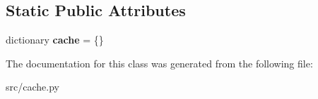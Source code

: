 \subsection*{\-Static \-Public \-Attributes}
\begin{DoxyCompactItemize}
\item 
\hypertarget{classsrc_1_1cache_1_1_chunk_cache_ad737632ad120595e27c9363c88e5767b}{dictionary {\bfseries cache} = \{\}}\label{classsrc_1_1cache_1_1_chunk_cache_ad737632ad120595e27c9363c88e5767b}

\end{DoxyCompactItemize}


\-The documentation for this class was generated from the following file\-:\begin{DoxyCompactItemize}
\item 
src/cache.\-py\end{DoxyCompactItemize}
